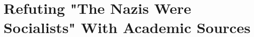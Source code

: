 \section[Refuting "The Nazis Were Socialists"]{Refuting "The Nazis Were Socialists" With Academic Sources\\}
